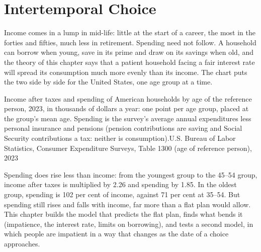 \chapter{Intertemporal Choice}\label{ch:b2:intertemporal-choice}

Income comes in a lump in mid-life: little at the start of a career, the most in the forties and
fifties, much less in retirement. Spending need not follow. A household can borrow when young, save
in its prime and draw on its savings when old, and the theory of this chapter says that a patient
household facing a fair interest rate will spread its consumption much more evenly than its income.
The chart puts the two side by side for the United States, one age group at a time.

\begin{openingchart}{Income after taxes and spending of American households by age of the reference
  person, 2023, in thousands of dollars a year: one point per age group, placed at the group's mean
  age. Spending is the survey's average annual expenditures less personal insurance and pensions
  (pension contributions are saving and Social Security contributions a tax: neither is consumption).}{U.S. Bureau of Labor
  Statistics, Consumer Expenditure Surveys, Table 1300 (age of reference person), 2023}
\end{openingchart}

Spending does rise less than income: from the youngest group to the 45--54 group, income after taxes
is multiplied by 2.26 and spending by 1.85. In the oldest group, spending is 102 per cent of income,
against 71 per cent at 35--54. But spending still rises and falls with income, far more than a flat
plan would allow. This chapter builds the model that predicts the flat plan, finds what bends it
(impatience, the interest rate, limits on borrowing), and tests a second model, in which people are
impatient in a way that changes as the date of a choice approaches.

